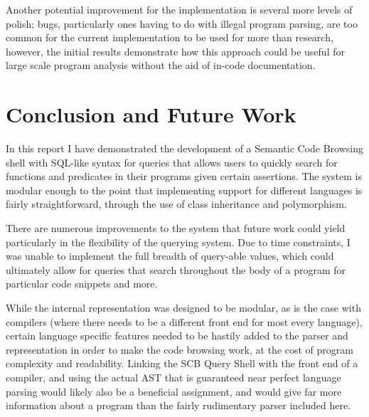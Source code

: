 \documentclass{article}
\begin{document}
Another potential improvement for the implementation is several more levels of polish; bugs, particularly ones having to do with illegal program parsing, are too common for the current implementation to be used for more than research, however, the initial results demonstrate how this approach could be useful for large scale program analysis without the aid of in-code documentation.

\section{Conclusion and Future Work}

In this report I have demonstrated the development of a Semantic Code Browsing shell with SQL-like syntax for queries that allows users to quickly search for functions and predicates in their programs given certain assertions. The system is modular enough to the point that implementing support for different languages is fairly straightforward, through the use of class inheritance and polymorphism.

There are numerous improvements to the system that future work could yield particularly in the flexibility of the querying system. Due to time constraints, I was unable to implement the full breadth of query-able values, which could ultimately allow for queries that search throughout the body of a program for particular code snippets and more.

While the internal representation was designed to be modular, as is the case with compilers (where there needs to be a different front end for most every language), certain language specific features needed to be hastily added to the parser and representation in order to make the code browsing work, at the cost of program complexity and readability. Linking the SCB Query Shell with the front end of a compiler, and using the actual AST that is guaranteed near perfect language parsing would likely also be a beneficial assignment, and would give far more information about a program than the fairly rudimentary parser included here.


  
\end{document}
